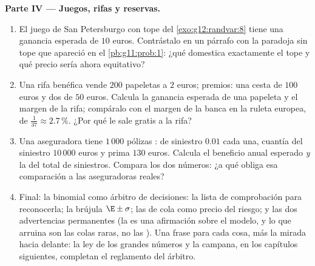 \begin{problem}
\medskip
\noindent\textbf{Parte IV --- Juegos, rifas y reservas.}
\begin{enumerate}[resume]
  \item El juego de San Petersburgo con tope del \cref{exo:g12:randvar:8}
        tiene una ganancia esperada de $10$ euros. Contrástalo en un
        párrafo con la paradoja sin tope que apareció en el
        \cref{pb:g11:prob:1}: ¿qué domestica exactamente el tope y qué
        precio sería ahora equitativo?
  \item Una rifa benéfica vende $200$ papeletas a $2$ euros; premios: una
        cesta de $100$ euros y dos de $50$ euros. Calcula la ganancia
        esperada de una papeleta y el margen de la rifa; compáralo con el
        margen de la banca en la ruleta europea, de
        $\frac{1}{37} \approx 2.7\,\%$. ¿Por qué le sale gratis a la rifa?
  \item Una aseguradora tiene $1\,000$ pólizas : 
        de siniestro $0.01$ cada una, cuantía del siniestro $10\,000$ euros
        y prima $130$ euros. Calcula el beneficio anual esperado \emph{y}
        la  del total de siniestros. Compara los dos
        números: ¿a qué obliga esa comparación a las aseguradoras reales?
  \item Final: la binomial como árbitro de decisiones: la lista de
        comprobación para reconocerla; la brújula $\E \pm \sigma$; las
         de cola como precio del riesgo; y las dos
        advertencias permanentes (la  es una afirmación sobre
        el modelo, y lo que arruina son las colas raras, no las ).
        Una frase para cada cosa, más la mirada hacia delante: la ley de
        los grandes números y la campana, en los capítulos siguientes,
        completan el reglamento del árbitro.
\end{enumerate}
\end{problem}

